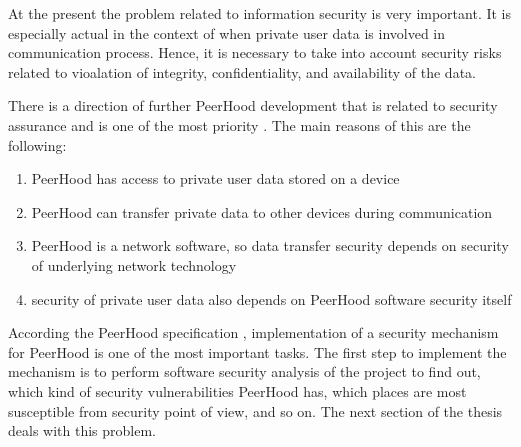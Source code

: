 %
At the present the problem related to information security is very important. 
%
It is especially actual in the context of  when private user data is involved in communication process. 
%
Hence, it is necessary to take into account security risks related to vioalation of integrity, confidentiality, and availability of the data. 


%
There is a direction of further PeerHood development that is related to security assurance and is one of the most priority . 
%
The main reasons of this are the following: 
\begin{enumerate}
	\item PeerHood has access to private user data stored on a device
	\item PeerHood can transfer private data to other devices during communication
	\item PeerHood is a network software, so data transfer security depends on security of underlying network technology
	\item security of private user data also depends on PeerHood software security itself
\end{enumerate}

%
According the PeerHood specification , implementation of a security mechanism for PeerHood is one of the most important tasks. 
%
The first step to implement the mechanism is to perform software security analysis of the project to find out, which kind of security vulnerabilities PeerHood has, which places are most susceptible from security point of view, and so on. 
%
The next section of the thesis deals with this problem. 